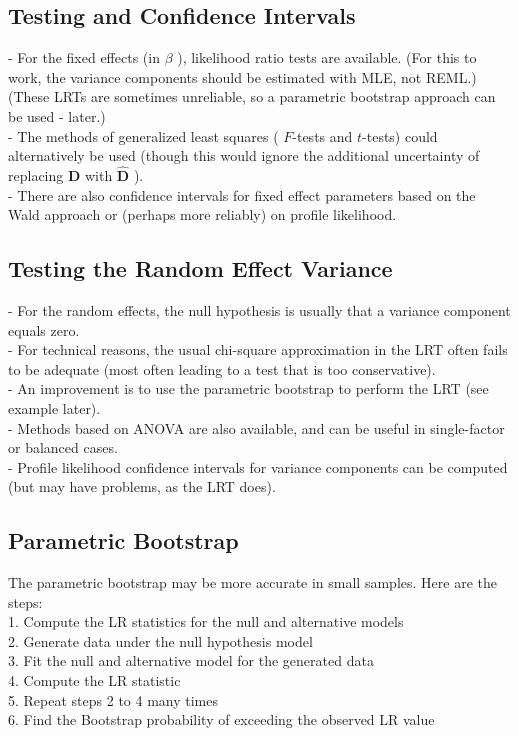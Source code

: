 \documentclass[11pt,a4paper]{article}
\begin{document}
\subsection{ Testing and Confidence Intervals}
- For the fixed effects (in $\beta$ ), likelihood ratio tests are available. (For this to work, the variance components should be estimated with MLE, not REML.)\\
(These LRTs are sometimes unreliable, so a parametric bootstrap approach can be used - later.)\\
- The methods of generalized least squares ( $F$-tests and $t$-tests) could alternatively be used (though this would ignore the additional uncertainty of replacing $\mathbf{D}$ with $\widehat{\mathbf{D}}$ ).\\
- There are also confidence intervals for fixed effect parameters based on the Wald approach or (perhaps more reliably) on profile likelihood.\\

\subsection{ Testing the Random Effect Variance}
- For the random effects, the null hypothesis is usually that a variance component equals zero.\\
- For technical reasons, the usual chi-square approximation in the LRT often fails to be adequate (most often leading to a test that is too conservative).\\
- An improvement is to use the parametric bootstrap to perform the LRT (see example later).\\
- Methods based on ANOVA are also available, and can be useful in single-factor or balanced cases.\\
- Profile likelihood confidence intervals for variance components can be computed (but may have problems, as the LRT does).\\



\subsection{Parametric Bootstrap}

The parametric bootstrap may be more accurate in small samples. Here are the steps:\\
1. Compute the LR statistics for the null and alternative models\\
2. Generate data under the null hypothesis model\\
3. Fit the null and alternative model for the generated data\\
4. Compute the LR statistic\\
5. Repeat steps 2 to 4 many times\\
6. Find the Bootstrap probability of exceeding the observed LR value\\
\end{document}
